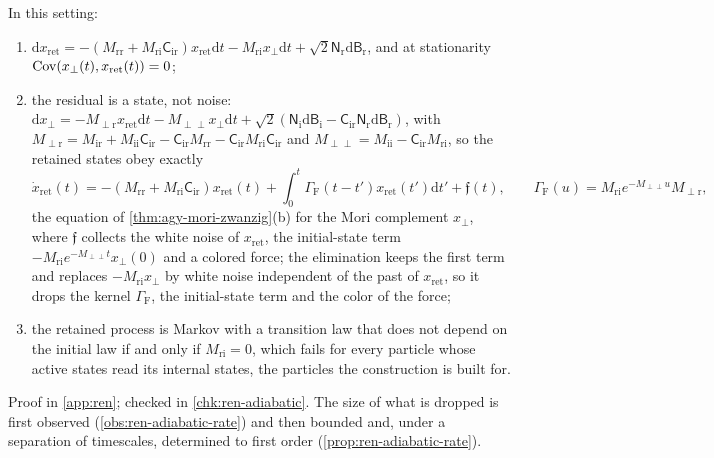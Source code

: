 \begin{proposition}\label{prop:ren-adiabatic}
In this setting:
\begin{enumerate}
\item[(a)] $\mathrm dx_{\mathrm{ret}}=-(M_{\mathrm{rr}}+M_{\mathrm{ri}}\mathsf C_{\mathrm{ir}})x_{\mathrm{ret}}\mathrm dt-M_{\mathrm{ri}}x_\perp\mathrm dt+\sqrt2\mathsf N_{\mathrm r}\mathrm d\mathsf B_{\mathrm r}$, and at stationarity $\operatorname{Cov}(x_\perp(t),x_{\mathrm{ret}}(t))=0$;
\item[(b)] the residual is a state, not noise: $\mathrm dx_\perp=-M_{\perp\mathrm r}x_{\mathrm{ret}}\mathrm dt-M_{\perp\perp}x_\perp\mathrm dt+\sqrt2(\mathsf N_{\mathrm i}\mathrm d\mathsf B_{\mathrm i}-\mathsf C_{\mathrm{ir}}\mathsf N_{\mathrm r}\mathrm d\mathsf B_{\mathrm r})$, with $M_{\perp\mathrm r}=M_{\mathrm{ir}}+M_{\mathrm{ii}}\mathsf C_{\mathrm{ir}}-\mathsf C_{\mathrm{ir}}M_{\mathrm{rr}}-\mathsf C_{\mathrm{ir}}M_{\mathrm{ri}}\mathsf C_{\mathrm{ir}}$ and $M_{\perp\perp}=M_{\mathrm{ii}}-\mathsf C_{\mathrm{ir}}M_{\mathrm{ri}}$, so the retained states obey exactly
\[
\dot x_{\mathrm{ret}}(t)=-(M_{\mathrm{rr}}+M_{\mathrm{ri}}\mathsf C_{\mathrm{ir}})x_{\mathrm{ret}}(t)+\int_0^t\Gamma_{\mathrm F}(t-t')x_{\mathrm{ret}}(t')\mathrm dt'+\mathfrak f(t),\qquad\Gamma_{\mathrm F}(u)=M_{\mathrm{ri}}e^{-M_{\perp\perp}u}M_{\perp\mathrm r},
\]
the equation of \cref{thm:agy-mori-zwanzig}(b) for the Mori complement $x_\perp$, where $\mathfrak f$ collects the white noise of $x_{\mathrm{ret}}$, the initial-state term $-M_{\mathrm{ri}}e^{-M_{\perp\perp}t}x_\perp(0)$ and a colored force; the elimination keeps the first term and replaces $-M_{\mathrm{ri}}x_\perp$ by white noise independent of the past of $x_{\mathrm{ret}}$, so it drops the kernel $\Gamma_{\mathrm F}$, the initial-state term and the color of the force;
\item[(c)] the retained process is Markov with a transition law that does not depend on the initial law if and only if $M_{\mathrm{ri}}=0$, which fails for every particle whose active states read its internal states, the particles the construction is built for.
\end{enumerate}
\end{proposition}
Proof in \cref{app:ren}; checked in \cref{chk:ren-adiabatic}. The size of what is dropped is first observed (\cref{obs:ren-adiabatic-rate}) and then bounded and, under a separation of timescales, determined to first order (\cref{prop:ren-adiabatic-rate}).

